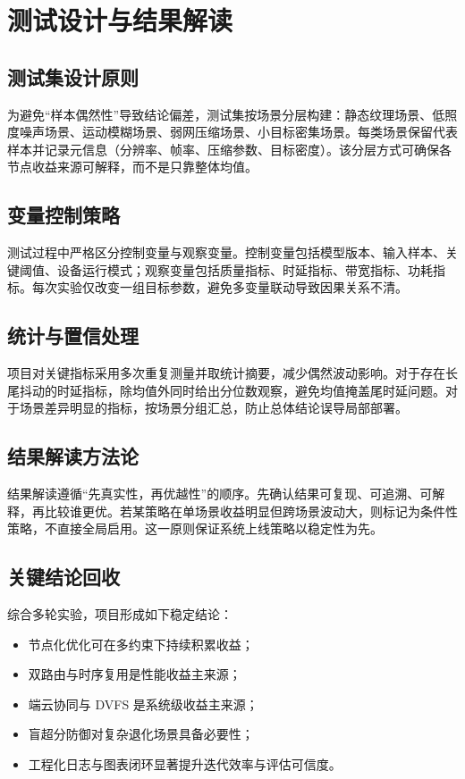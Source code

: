 \documentclass[12pt,a4paper]{ctexart}
\begin{document}
\section{测试设计与结果解读}

\subsection{测试集设计原则}

为避免“样本偶然性”导致结论偏差，测试集按场景分层构建：静态纹理场景、低照度噪声场景、运动模糊场景、弱网压缩场景、小目标密集场景。每类场景保留代表样本并记录元信息（分辨率、帧率、压缩参数、目标密度）。该分层方式可确保各节点收益来源可解释，而不是只靠整体均值。

\subsection{变量控制策略}

测试过程中严格区分控制变量与观察变量。控制变量包括模型版本、输入样本、关键阈值、设备运行模式；观察变量包括质量指标、时延指标、带宽指标、功耗指标。每次实验仅改变一组目标参数，避免多变量联动导致因果关系不清。

\subsection{统计与置信处理}

项目对关键指标采用多次重复测量并取统计摘要，减少偶然波动影响。对于存在长尾抖动的时延指标，除均值外同时给出分位数观察，避免均值掩盖尾时延问题。对于场景差异明显的指标，按场景分组汇总，防止总体结论误导局部部署。

\subsection{结果解读方法论}

结果解读遵循“先真实性，再优越性”的顺序。先确认结果可复现、可追溯、可解释，再比较谁更优。若某策略在单场景收益明显但跨场景波动大，则标记为条件性策略，不直接全局启用。这一原则保证系统上线策略以稳定性为先。

\subsection{关键结论回收}

综合多轮实验，项目形成如下稳定结论：
\begin{itemize}
  \item 节点化优化可在多约束下持续积累收益；
  \item 双路由与时序复用是性能收益主来源；
  \item 端云协同与 DVFS 是系统级收益主来源；
  \item 盲超分防御对复杂退化场景具备必要性；
  \item 工程化日志与图表闭环显著提升迭代效率与评估可信度。
\end{itemize}
\end{document}
